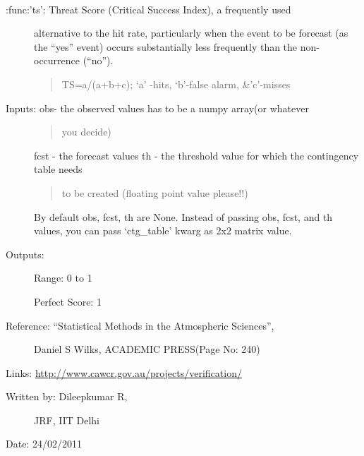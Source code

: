 \documentclass[letterpaper,10pt,english]{sphinxmanual}
\begin{document}
\begin{fulllineitems}
\label{diagnosis:ctgfunction.ts}~\begin{description}
\item[{:func:'ts':    Threat Score (Critical Success Index), a frequently used}] \leavevmode
alternative to the hit rate, particularly when the event to be
forecast (as the ``yes'' event) occurs substantially less frequently
than the non-occurrence (``no'').
\begin{quote}

TS=a/(a+b+c); `a' -hits, `b'-false alarm, \&'c'-misses
\end{quote}

\item[{Inputs: obs- the observed values has to be a numpy array(or whatever}] \leavevmode\begin{quote}

you decide)
\end{quote}

fcst - the forecast values
th  - the threshold value for which the contingency table needs
\begin{quote}

to be created (floating point value please!!)
\end{quote}

By default obs, fcst, th are None. Instead of passing obs, fcst,
and th values, you can pass `ctg\_table' kwarg as 2x2 matrix value.

\item[{Outputs:}] \leavevmode
Range: 0 to 1

Perfect Score: 1

\item[{Reference: ``Statistical Methods in the Atmospheric Sciences'',}] \leavevmode
Daniel S Wilks, ACADEMIC PRESS(Page No: 240)

\end{description}

Links: \href{http://www.cawcr.gov.au/projects/verification/}{http://www.cawcr.gov.au/projects/verification/}
\begin{description}
\item[{Written by: Dileepkumar R,}] \leavevmode
JRF, IIT Delhi

\end{description}

Date: 24/02/2011

\end{fulllineitems}
\end{document}
